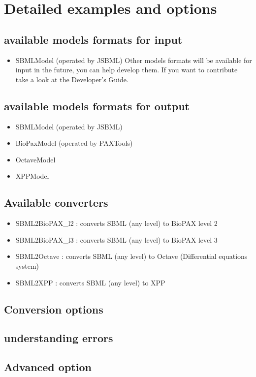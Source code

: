 \documentclass{article}
\begin{document}
\section{Detailed examples and options}
	\subsection{available models formats for input}
\begin{itemize}
\item SBMLModel (operated by JSBML)
Other models formats will be available for input in the future, you can help develop them. If you want to contribute take a look at the Developer's Guide.
\end{itemize}
	\subsection{available models formats for output}
\begin{itemize}
\item SBMLModel (operated by JSBML)
\item BioPaxModel (operated by PAXTools)
\item OctaveModel
\item XPPModel
\end{itemize}
	\subsection{Available converters}
\begin{itemize}
\item SBML2BioPAX\_l2 : converts SBML (any level) to BioPAX level 2
\item SBML2BioPAX\_l3 : converts SBML (any level) to BioPAX level 3
\item SBML2Octave : converts SBML (any level) to Octave (Differential equations system)
\item SBML2XPP : converts SBML (any level) to XPP
\end{itemize}
	\subsection{Conversion options}
	\subsection{understanding errors}
	\subsection{Advanced option}
\end{document}
